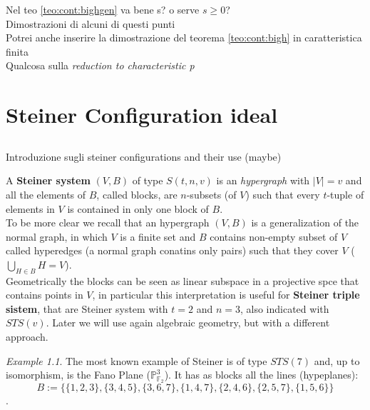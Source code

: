 \documentclass[]{book}
\theoremstyle{plain}
\theoremstyle{remark}
\newtheorem{ex}[rem]{Example}
\theoremstyle{definition}
\newcommand{\PP}{\mathbb{P}}
\begin{document}
\begin{tcolorbox}
Nel teo \ref{teo:cont:bighgen} va bene s? o serve $ s\geq 0 $?\\
Dimostrazioni di alcuni di questi punti\\
Potrei anche inserire la dimostrazione del teorema \ref{teo:cont:bigh} in caratteristica finita\\
Qualcosa sulla \textit{reduction to characteristic p}
\end{tcolorbox}

 	
	


\chapter{Steiner Configuration ideal}
\section*{}
\begin{tcolorbox}
Introduzione sugli steiner configurations and their use (maybe)
\end{tcolorbox}

A \textbf{Steiner system} $ (V,B) $ of type $ S(t,n,v) $ is an \textit{hypergraph} with $ |V|=v $ and all the elements of $ B $, called blocks, are $ n $-subsets (of $ V $) such that every $ t $-tuple of elements in $ V $ is contained in only one block of $ B $. \\
To be more clear we recall that an hypergraph $ (V,B) $ is a generalization of the normal graph, in which $ V $ is a finite set and $ B $ contains non-empty subset of $ V $ called hyperedges (a normal graph conatins only pairs) such that they cover $ V $ ($ \bigcup_{H \in B} H = V $).\\
Geometrically the blocks can be seen as linear subspace in a projective spce that contains points in $ V $, in particular this interpretation is useful for \textbf{Steiner triple sistem}, that are Steiner system with $ t=2 $ and $ n=3 $, also indicated with $ STS(v) $. Later we will use again algebraic geometry, but with a different approach.

\begin{ex} \label{ex:fano1}
	The most known example of Steiner is of type $ STS(7) $ and, up to isomorphism, is the Fano Plane ($ \PP_{\mathbb{F}_2}^3 $). It has as blocks all the lines (hypeplanes):
	\[B := \{\{1, 2, 3\}, \{3, 4, 5\}, \{3, 6, 7\}, \{1, 4, 7\}, \{2, 4, 6\}, \{2, 5, 7\}, \{1, 5, 6\}\}\].
\end{ex}
\end{document}

